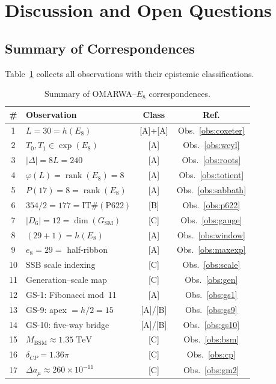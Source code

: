 \documentclass[11pt, a4paper]{article}
\theoremstyle{plain}
\theoremstyle{definition}
\theoremstyle{remark}
\DeclareMathOperator{\rank}{rank}
\begin{document}
\section{Discussion and Open Questions}
\label{sec:conclusion}

\subsection{Summary of Correspondences}

Table~\ref{tab:summary} collects all observations with their
epistemic classifications.

\begin{table}[H]
\centering
\caption{Summary of OMARWA--$E_8$ correspondences.}\label{tab:summary}
\smallskip
\begin{tabular}{@{}clcc@{}}
\toprule
\# & Observation & Class & Ref. \\
\midrule
1 & $L = 30 = h(E_8)$ & [A]+[A] & Obs.~\ref{obs:coxeter} \\
2 & $T_0, T_1 \in \exp(E_8)$ & [A] & Obs.~\ref{obs:weyl} \\
3 & $|\Delta| = 8L = 240$ & [A] & Obs.~\ref{obs:roots} \\
4 & $\varphi(L) = \rank(E_8) = 8$ & [A] & Obs.~\ref{obs:totient} \\
5 & $P(17) = 8 = \rank(E_8)$ & [A] & Obs.~\ref{obs:sabbath} \\
6 & $354/2 = 177 = \mathrm{IT\#(P622)}$ & [B] & Obs.~\ref{obs:p622} \\
7 & $|D_6| = 12 = \dim(G_{\mathrm{SM}})$ & [C] & Obs.~\ref{obs:gauge} \\
8 & $(29+1) = h(E_8)$ & [A] & Obs.~\ref{obs:window} \\
9 & $e_8 = 29 = $ half-ribbon & [A] & Obs.~\ref{obs:maxexp} \\
10 & SSB scale indexing & [C] & Obs.~\ref{obs:scale} \\
11 & Generation--scale map & [C] & Obs.~\ref{obs:gen} \\
12 & GS-1: Fibonacci mod~11 & [A] & Obs.~\ref{obs:gs1} \\
13 & GS-9: apex $= h/2 = 15$ & [A]/[B] & Obs.~\ref{obs:gs9} \\
14 & GS-10: five-way bridge & [A]/[B] & Obs.~\ref{obs:gs10} \\
15 & $M_{\mathrm{BSM}} \approx 1.35\;\mathrm{TeV}$ & [C] & Obs.~\ref{obs:bsm} \\
16 & $\delta_{CP} = 1.36\pi$ & [C] & Obs.~\ref{obs:cp} \\
17 & $\Delta a_\mu \approx 260 \times 10^{-11}$ & [C] & Obs.~\ref{obs:gm2} \\
\bottomrule
\end{tabular}
\end{table}
\end{document}
